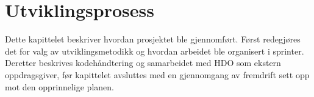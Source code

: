 \chapter{Utviklingsprosess}
\label{ch:utvikling}

Dette kapittelet beskriver hvordan prosjektet ble gjennomført. Først redegjøres det for valg av utviklingsmetodikk og hvordan arbeidet ble organisert i sprinter. Deretter beskrives kodehåndtering og samarbeidet med HDO som ekstern oppdragsgiver, før kapittelet avsluttes med en gjennomgang av fremdrift sett opp mot den opprinnelige planen.




